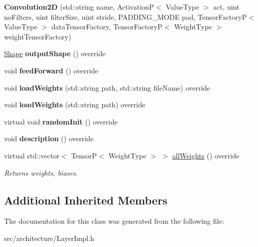 \begin{DoxyCompactItemize}
\item 
\mbox{\label{classConvolution2D_aa4d634085ca7ab3d1945185d8c908dc9}} 
{\bfseries Convolution2D} (std\+::string name, ActivationP$<$ Value\+Type $>$ act, uint no\+Filters, uint filter\+Size, uint stride, P\+A\+D\+D\+I\+N\+G\+\_\+\+M\+O\+DE pad, Tensor\+FactoryP$<$ Value\+Type $>$ data\+Tensor\+Factory, Tensor\+FactoryP$<$ Weight\+Type $>$ weight\+Tensor\+Factory)
\item 
\mbox{\label{classConvolution2D_a713b56c33b0595d1095397129391e70e}} 
\hyperlink{classShape}{Shape} {\bfseries output\+Shape} () override
\item 
\mbox{\label{classConvolution2D_a2031c3d59486ce80626f04ae21a34162}} 
void {\bfseries feed\+Forward} () override
\item 
\mbox{\label{classConvolution2D_aa3084202934370bcb7a81894657dc51c}} 
void {\bfseries load\+Weights} (std\+::string path, std\+::string file\+Name) override
\item 
\mbox{\label{classConvolution2D_a1d8cfc56655d5b2321a27a8e99a8d2cf}} 
void {\bfseries load\+Weights} (std\+::string path) override
\item 
\mbox{\label{classConvolution2D_a60f6c470cee849147107690c4662ba0f}} 
virtual void {\bfseries random\+Init} () override
\item 
\mbox{\label{classConvolution2D_ae0fdd1ea63c8c9de35069d2ae115b114}} 
void {\bfseries description} () override
\item 
\mbox{\label{classConvolution2D_a32c8da64840fa7a3527e0b4180faaff8}} 
virtual std\+::vector$<$ TensorP$<$ Weight\+Type $>$ $>$ \hyperlink{classConvolution2D_a32c8da64840fa7a3527e0b4180faaff8}{all\+Weights} () override
\begin{DoxyCompactList}\small\item\em Returns weights, biases. \end{DoxyCompactList}\end{DoxyCompactItemize}
\subsection*{Additional Inherited Members}


The documentation for this class was generated from the following file\+:\begin{DoxyCompactItemize}
\item 
src/architecture/Layer\+Impl.\+h\end{DoxyCompactItemize}
